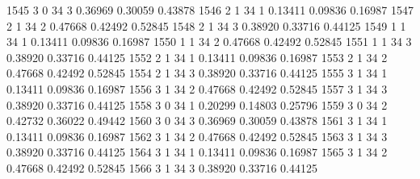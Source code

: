 \documentclass{article}
\begin{document}
\begin{Woutput}
1545      3       0      34       3       0.36969    0.30059    0.43878
1546      2       1      34       1       0.13411    0.09836    0.16987
1547      2       1      34       2       0.47668    0.42492    0.52845
1548      2       1      34       3       0.38920    0.33716    0.44125
1549      1       1      34       1       0.13411    0.09836    0.16987
1550      1       1      34       2       0.47668    0.42492    0.52845
1551      1       1      34       3       0.38920    0.33716    0.44125
1552      2       1      34       1       0.13411    0.09836    0.16987
1553      2       1      34       2       0.47668    0.42492    0.52845
1554      2       1      34       3       0.38920    0.33716    0.44125
1555      3       1      34       1       0.13411    0.09836    0.16987
1556      3       1      34       2       0.47668    0.42492    0.52845
1557      3       1      34       3       0.38920    0.33716    0.44125
1558      3       0      34       1       0.20299    0.14803    0.25796
1559      3       0      34       2       0.42732    0.36022    0.49442
1560      3       0      34       3       0.36969    0.30059    0.43878
1561      3       1      34       1       0.13411    0.09836    0.16987
1562      3       1      34       2       0.47668    0.42492    0.52845
1563      3       1      34       3       0.38920    0.33716    0.44125
1564      3       1      34       1       0.13411    0.09836    0.16987
1565      3       1      34       2       0.47668    0.42492    0.52845
1566      3       1      34       3       0.38920    0.33716    0.44125


\end{Woutput}
\end{document}

